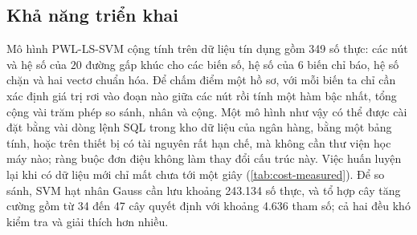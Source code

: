 \subsection{Khả năng triển khai}

Mô hình PWL-LS-SVM cộng tính trên dữ liệu tín dụng gồm 349 số thực: các nút và hệ số của $20$ đường gấp khúc cho các biến số, hệ số của $6$ biến chỉ báo, hệ số chặn và hai vectơ chuẩn hóa. Để chấm điểm một hồ sơ, với mỗi biến ta chỉ cần xác định giá trị rơi vào đoạn nào giữa các nút rồi tính một hàm bậc nhất, tổng cộng vài trăm phép so sánh, nhân và cộng. Một mô hình như vậy có thể được cài đặt bằng vài dòng lệnh SQL trong kho dữ liệu của ngân hàng, bằng một bảng tính, hoặc trên thiết bị có tài nguyên rất hạn chế, mà không cần thư viện học máy nào; ràng buộc đơn điệu không làm thay đổi cấu trúc này. Việc huấn luyện lại khi có dữ liệu mới chỉ mất chưa tới một giây (\cref{tab:cost-measured}). Để so sánh, SVM hạt nhân Gauss cần lưu khoảng 243.134 số thực, và tổ hợp cây tăng cường gồm từ 34 đến 47 cây quyết định với khoảng 4.636 tham số; cả hai đều khó kiểm tra và giải thích hơn nhiều.
